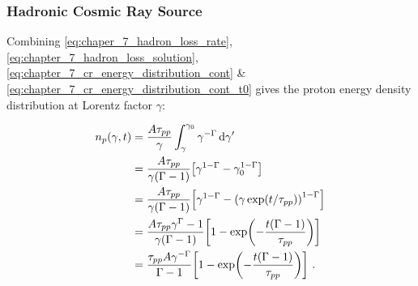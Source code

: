 \subsubsection{Hadronic Cosmic Ray Source}

Combining \autoref{eq:chaper_7_hadron_loss_rate}, \autoref{eq:chapter_7_hadron_loss_solution}, \autoref{eq:chapter_7_cr_energy_distribution_cont} \& \autoref{eq:chapter_7_cr_energy_distribution_cont_t0} gives the proton energy density distribution at Lorentz factor $\gamma$:

\begin{equation}
    \begin{aligned}
    n_p\qty(\gamma,t)&=\frac{A\tau_{pp}}{\gamma}\int_\gamma^{\gamma_0} \gamma^{-\Gamma} \dd{\gamma'} \\
	&=\frac{A\tau_{pp}}{\gamma(\Gamma-1)}\qty[\gamma^{1-\Gamma}-\gamma_0^{1-\Gamma}] \\
	&=\frac{A\tau_{pp}}{\gamma(\Gamma-1)}\qty[\gamma^{1-\Gamma}-\qty(\gamma\exp(t/\tau_{pp}))^{1-\Gamma}] \\
	&=\frac{A\tau_{pp}\gamma^{\Gamma}-1}{\gamma(\Gamma-1)}\qty[1-\exp(-\frac{t\qty(\Gamma-1)}{\tau_{pp}})] \\
	&=\frac{\tau_{pp}A\gamma^{-\Gamma}}{\Gamma-1}\qty[1-\exp(-\frac{t\qty(\Gamma-1)}{\tau_{pp}})] \text{ .}
    \end{aligned} \label{eq:chapter_7_cont_hadronic_cr_energy_distrib}
\end{equation}

